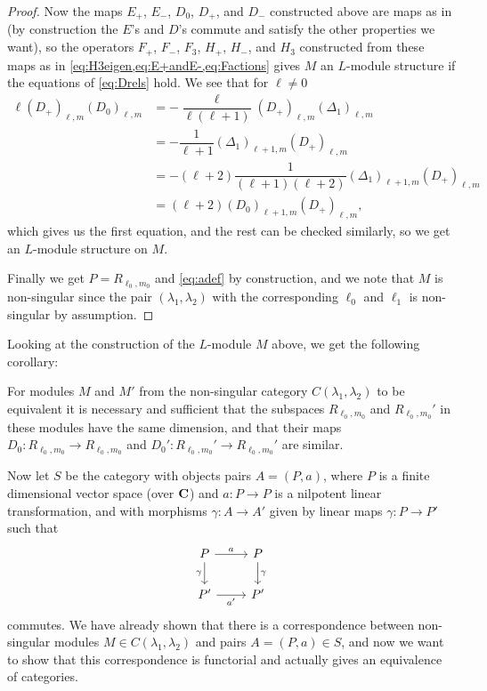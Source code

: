 \begin{proof}
  Now the maps $E_+$, $E_-$, $D_0$, $D_+$, and $D_-$ constructed above are maps as in  (by construction the $E$'s and $D$'s commute and satisfy the other properties we want), so the operators $F_+$, $F_-$, $F_3$, $H_+$, $H_-$, and $H_3$ constructed from these maps as in \cref{eq:H3eigen,eq:E+andE-,eq:Factions} gives $M$ an $L$-module structure if the equations of \cref{eq:Drels} hold. We see that for $\ell\neq 0$
\begin{align*}
  \ell(D_+)_{\ell,m}(D_0)_{\ell,m} &= -\dfrac{\ell}{\ell(\ell+1)} (D_+)_{\ell,m}(\Delta_1)_{\ell,m} \\
                          &= - \dfrac{1}{\ell+1} (\Delta_1)_{\ell+1,m} (D_+)_{\ell,m} \\
                          &= - (\ell+2)\dfrac{1}{(\ell+1)(\ell+2)} (\Delta_1)_{\ell+1,m} (D_+)_{\ell,m} \\
                          &= (\ell+2)(D_0)_{\ell+1,m}(D_+)_{\ell,m},
\end{align*}
which gives us the first equation, and the rest can be checked similarly, so we get an $L$-module structure on $M$.

  Finally we get $P=R_{\ell_0,m_0}$ and \cref{eq:adef} by construction, and we note that $M$ is non-singular since the pair $(\lambda_1,\lambda_2)$ with the corresponding $\ell_0$ and $\ell_1$ is non-singular by assumption.
\end{proof}

Looking at the construction of the $L$-module $M$ above, we get the following corollary:
\begin{corollary}
  For modules $M$ and $M'$ from the non-singular category $C(\lambda_1,\lambda_2)$ to be equivalent it is necessary and sufficient that the subspaces $R_{\ell_0,m_0}$ and $R_{\ell_0,m_0}'$ in these modules have the same dimension, and that their maps $D_0\colon R_{\ell_0,m_0}\to R_{\ell_0,m_0}$ and $D_0'\colon R_{\ell_0,m_0}'\to R_{\ell_0,m_0}'$ are similar. 
\end{corollary}

Now let $S$ be the category with objects pairs $A=(P,a)$, where $P$ is a finite dimensional vector space (over $\mathbf{C}$) and $a\colon P\to P$ is a nilpotent linear transformation, and with morphisms $\gamma\colon A\to A'$ given by linear maps $\gamma\colon P\to P'$ such that
\[
  \begin{tikzcd}
    P\ar[r,"a"] \ar[d,"\gamma",swap] & P \ar[d,"\gamma"] \\
    P' \ar[r,"a'",swap] & P'
  \end{tikzcd}
\]
commutes. We have already shown that there is a correspondence between non-singular modules $M\in C(\lambda_1,\lambda_2)$ and pairs $A=(P,a)\in S$, and now we want to show that this correspondence is functorial and actually gives an equivalence of categories.

